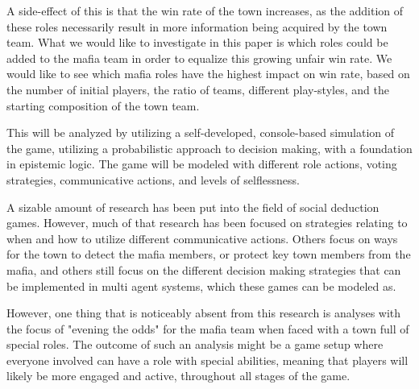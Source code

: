 A side-effect of this is that the win rate of the town increases, as the
addition of these roles necessarily result in more information being acquired
by the town team. What we would like to investigate in this paper is which
roles could be added to the mafia team in order to equalize this growing unfair
win rate. We would like to see which mafia roles have the highest impact on win
rate, based on the number of initial players, the ratio of teams, different
play-styles, and the starting composition of the town team.

This will be analyzed by utilizing a self-developed, console-based simulation
of the game, utilizing a probabilistic approach to decision making, with a
foundation in epistemic logic. The game will be modeled with different role
actions, voting strategies, communicative actions, and levels of selflessness.

A sizable amount of research has been put into the field of social deduction
games. However, much of that research has been focused on strategies relating
to when and how to utilize different communicative actions\cite{commitment}.
Others focus on ways for the town to detect the mafia
members\cite{werewolf_stealth}, or protect key town members from the
mafia\cite{werewolf_nash_equilibrium}, and others still focus on the different
decision making strategies that can be implemented in multi agent systems,
which these games can be modeled
as\cite{modelling_multi_agent_epistemic_systems}\cite{multi_agent_epistemic_planner_common_knowledge}\cite{probibalistic_multiagent_systems}.

However, one thing that is noticeably absent from this research is analyses
with the focus of "evening the odds" for the mafia team when faced with a town
full of special roles. The outcome of such an analysis might be a game setup
where everyone involved can have a role with special abilities, meaning that
players will likely be more engaged and active, throughout all stages of the
game.